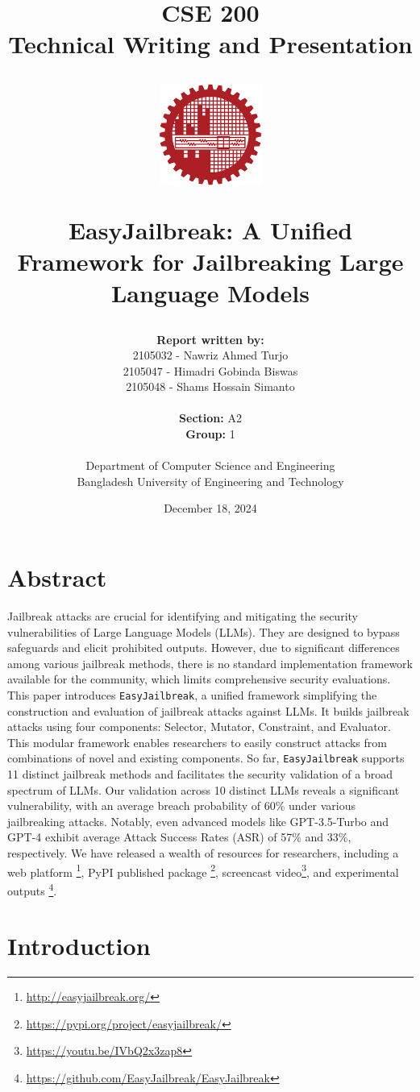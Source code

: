 \documentclass[18pt]{article}
\title{CSE 200 \\
	Technical Writing and Presentation \\
	
	\vspace{5mm}
	
	\begin{figure}[h]
		\centering
		\includegraphics[width=0.3\textwidth]{images/buet.png}
		\label{fig:enter-label}
	\end{figure}
	
	\textbf{EasyJailbreak: A Unified Framework for Jailbreaking Large Language
	Models}}
\author{
	\textbf{Report written by:} \\
	2105032 - Nawriz Ahmed Turjo\\
	2105047 - Himadri Gobinda Biswas\\
	2105048 - Shams Hossain Simanto \\ \\
	\textbf{Section:} A2\\
	\textbf{Group:} 1\\ \\
	Department of Computer Science and Engineering\\
	Bangladesh University of Engineering and Technology\\
}
\date{December 18, 2024}
\begin{document}
	\maketitle
	\pagebreak
	
	\setlength{\parskip}{0.5em}
	
	\tableofcontents
	
	\setlength{\parskip}{1em}
	\newpage
	
	\listoffigures
	\newpage
	
	\listoftables
	\newpage
	
	\newpage
	
	\section*{Abstract}	
	
	Jailbreak attacks are crucial for identifying and mitigating the security vulnerabilities of Large Language Models (LLMs). They are designed to bypass safeguards and elicit prohibited outputs.  
        However, due to significant differences among various jailbreak methods, there is no standard implementation framework available for the community, which limits comprehensive security evaluations. 
        This paper introduces \texttt{EasyJailbreak}, a unified framework simplifying the construction and evaluation of jailbreak attacks against LLMs. 
        It builds jailbreak attacks using four components: Selector, Mutator, Constraint, and Evaluator. 
        This modular framework enables researchers to easily construct attacks from combinations of novel and existing components.
        So far, \texttt{EasyJailbreak} supports 11 distinct jailbreak methods and facilitates the security validation of a broad spectrum of LLMs.
        Our validation across 10 distinct LLMs reveals a significant vulnerability, with an average breach probability of 60\% under various jailbreaking attacks. Notably, even advanced models like GPT-3.5-Turbo and GPT-4 exhibit average Attack Success Rates (ASR) of 57\% and 33\%, respectively.
        We have released a wealth of resources for researchers, including a web platform \footnote{\url{http://easyjailbreak.org/}}, PyPI published package \footnote{\url{https://pypi.org/project/easyjailbreak/}}, screencast video\footnote{\url{https://youtu.be/IVbQ2x3zap8}}, and experimental outputs \footnote{\url{https://github.com/EasyJailbreak/EasyJailbreak}}.


		\section{Introduction}
\end{document}
